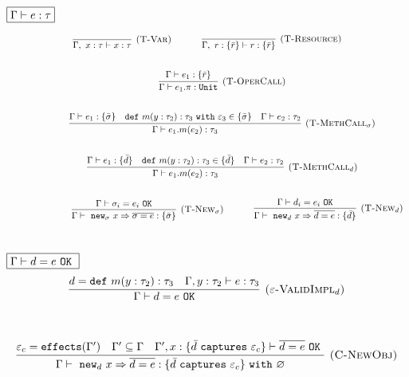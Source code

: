 \documentclass{llncs}
\newcommand{\keywadj}[1]{\mathtt{#1}}
\newcommand{\keyw}[1]{\keywadj{#1}~}
\begin{document}
$\fbox{$\Gamma \vdash e : \tau$}$

\[
\begin{array}{c}
\infer[\textsc{(T-Var)}]
	{\Gamma,~x : \tau \vdash x : \tau}
	{}
~~~~~~~~~~
\infer[\textsc{(T-Resource)}]
	{\Gamma,~r : \{ \bar r \} \vdash r : \{ \bar r \}}
	{} \\[5ex]
~~~~~~~~~~
\infer[\textsc{(T-OperCall)}]
	{\Gamma \vdash e_1.\pi : \keywadj{Unit}}
	{\Gamma \vdash e_1 : \{ \bar r \}} \\[5ex]
~~~~~~~~~~
\infer[\textsc{(T-MethCall$_\sigma$)}]
	{\Gamma \vdash e_1.m(e_2) : \tau_3}
	{\Gamma \vdash e_1 : \{ \bar \sigma \} & \keyw{def} m(y : \tau_2) : \tau_3~\keyw{with} \varepsilon_3 \in \{ \bar \sigma \} &  \Gamma \vdash e_2 : \tau_2 }\\[5ex]
~~~~~~~~~~
\infer[\textsc{(T-MethCall$_d$)}]
	{\Gamma \vdash e_1.m(e_2) : \tau_3}
	{\Gamma \vdash e_1 : \{ \bar d\} & \keyw{def} m(y : \tau_2) : \tau_3 \in \{ \bar d \} &  \Gamma \vdash e_2 : \tau_2 }\\[5ex]
~~~~~~~~~~

~~~~~~~~~~
\infer[\textsc{(T-New$_\sigma$)}]
	{\Gamma \vdash~\keywadj{new}_\sigma~x \Rightarrow \overline{\sigma = e} : \{ \bar \sigma \}}
	{\Gamma \vdash \sigma_i = e_i~\keywadj{OK}}
~~~~~~~~~~
\infer[\textsc{(T-New$_d$)}]
	{\Gamma \vdash~\keywadj{new}_d~x \Rightarrow \overline{d = e} : \{ \bar d \}}
	{\Gamma \vdash d_i = e_i~\keywadj{OK}}\\[5ex]
\end{array}
\]

$\fbox{$\Gamma \vdash d = e~\keyw{OK}$}$
\[
\begin{array}{c}
\infer[\textsc{($\varepsilon$-ValidImpl$_d$)}]
	{\Gamma \vdash d = e~\keywadj{OK}}
	{d = \keyw{def} m(y : \tau_2) : \tau_3 & \Gamma, y : \tau_2 \vdash e : \tau_3}
	\\[5ex]
\end{array}
\]

\fbox{$\Gamma \vdash e : \tau~\keyw{with} \varepsilon$}

\[
\begin{array}{c}
\infer[\textsc{(C-NewObj)}]
	{\Gamma \vdash~\keywadj{new}_d~x \Rightarrow \overline{d = e} : \{  \bar d~\keyw{captures} \varepsilon_c \} ~\keyw{with} \varnothing }
	{\varepsilon_c = \keywadj{effects}(\Gamma') & \Gamma' \subseteq \Gamma & \Gamma', x : \{ \bar d~\keyw {captures} \varepsilon_c \} \vdash \overline{d = e}~\keyw{OK}} \\[5ex]
\end{array}
\]
\end{document}

